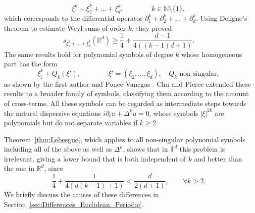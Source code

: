\documentclass[11pt,reqno]{amsart}
\theoremstyle{definition}
\numberwithin{equation}{section}
\theoremstyle{remark}
\begin{document}
\begin{equation}\label{eq:Symbol_AnChuPierce}
\xi_1^k + \xi_2^k + \ldots + \xi_d^k, \qquad \qquad k \in \mathbb N \setminus \{1\}, 
\end{equation}
which corresponds to the differential operator $\partial_1^k + \partial_2^k + \ldots + \partial_d^k$. 
Using Deligne's theorem to estimate Weyl sums of order $k$, they proved 
\begin{equation}\label{eq:Result_In_Rd}
s_{\xi_1^k + \ldots + \xi_d^k}(\mathbb R^d) \geq \frac14 + \frac{d-1}{4((k-1)d+1)} %
.
\end{equation}
The same results hold for polynomial symbols of degree $k$ whose homogeneous part has the form
\begin{equation}
    \xi_1^k + Q_k(\xi'), \qquad \qquad \xi' = (\xi_2, \ldots, \xi_d), \quad Q_k \text{ non-singular},
\end{equation}
as shown by the first author and Ponce-Vanegas \cite{EceizabarrenaPonceVanegas2022}.
Chu and Pierce \cite{ChuPierce2023} extended these results to a broader family of symbols, classifying them according to
the amount of cross-terms.
All these symbols can be regarded as intermediate steps towards the natural dispersive equations $i\partial_t u + \Delta^k u = 0$, whose symbols $|\xi|^{2k}$ are polynomials but do not separate variables if $k \geq 2$.

Theorem~\ref{thm:Lebesgue}, 
which applies to all non-singular polynomial symbols including all of the above as well as $\Delta^k$, 
shows that in $\mathbb T^d$ 
this problem is irrelevant, 
giving a lower bound that is both independent of $k$ 
and better than the one in $\mathbb R^d$, since 
\begin{equation}
 \frac14 + \frac{1}{4( d(k-1)+ 1 )} <  \frac{d}{2(d+1)},
 \qquad \forall k > 2. 
\end{equation} 
We briefly discuss the causes of these differences in Section~\ref{sec:Differences_Euclidean_Periodic}.
\end{document}
